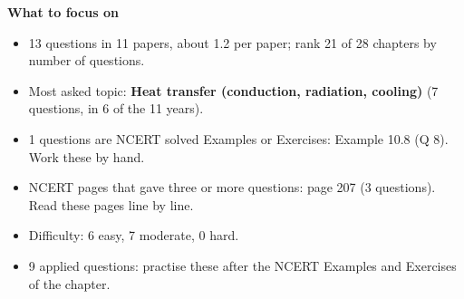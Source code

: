 \begin{minipage}[t]{0.63\linewidth}{\small\textbf{\color{crimson}What to focus on}\par\smallskip
\begin{itemize}[leftmargin=1.1em,itemsep=1pt,topsep=0pt]
\item 13 questions in 11 papers, about 1.2 per paper; rank 21 of 28 chapters by number of questions.
\item Most asked topic: \textbf{Heat transfer (conduction, radiation, cooling)} (7 questions, in 6 of the 11 years).
\item 1 questions are NCERT solved Examples or Exercises: Example 10.8 (Q 8). Work these by hand.
\item NCERT pages that gave three or more questions: page 207 (3 questions). Read these pages line by line.
\item Difficulty: 6 easy, 7 moderate, 0 hard.
\item 9 applied questions: practise these after the NCERT Examples and Exercises of the chapter.
\end{itemize}}\end{minipage}\par
{}
